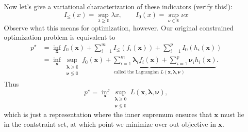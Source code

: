 \documentclass[10pt,letterpaper]{article}
\theoremstyle{definition}
\theoremstyle{remark}
\newcommand\R{\mathbb{R}}
\newcommand\x{\boldsymbol{x}}
\newcommand\lambdab{\boldsymbol{\lambda}}
\newcommand\nub{\boldsymbol{\nu}}
\begin{document}
\begin{center}
\end{center}

Now let's give a variational characterization of these indicators (verify this!):
\[
    I_\leq(x) = \sup_{\lambda \geq 0} \lambda x,\qquad I_0(x) = \sup_{\nu\in\R} \nu x
\]
Observe what this means for optimization, however. Our original constrained optimization
problem is equivalent to
\begin{align*}
    p^\star &= \inf_{\x} f_0(\x) + \sum_{i=1}^m I_\leq(f_i(\x)) + \sum_{i=1}^p I_0(h_i(\x))\\
    &= \inf_{\x}\sup_{\substack{\lambdab\geq 0\\\nub\lessgtr 0}} \underbrace{f_0(\x) + \sum_{i=1}^m \lambdab_i f_i(\x) + \sum_{i=1}^p \nub_i h_i(\x)}_\text{called the Lagrangian $L(\x,\lambdab,\nub)$}.
\end{align*}
Thus
\[
    p^\star = \inf_{\x}\sup_{\substack{\lambdab\geq 0\\\nub\lessgtr 0}} L(\x,\lambdab,\nub),
\]
which is just a representation where the inner supremum ensures that $\x$ must lie in the contstraint
set, at which point we minimize over out objective in $\x$.\\
\end{document}
